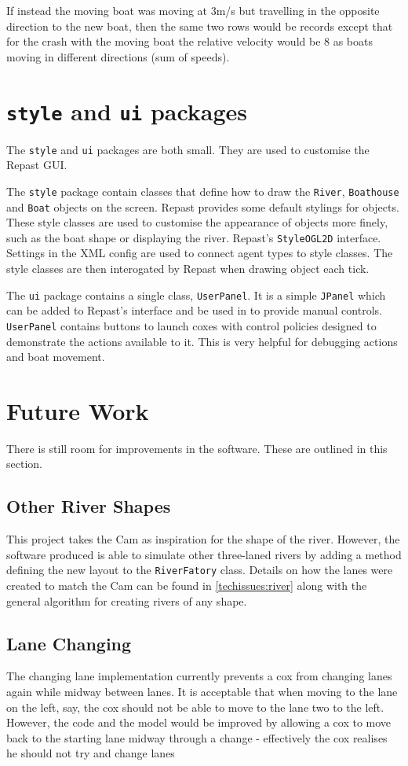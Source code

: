 If instead the moving boat was moving at 3m/s but travelling in the opposite direction to the new boat, then the same two rows would be records except that for the crash with the moving boat the relative velocity would be 8 as boats moving in different directions (sum of speeds).

\section{\texttt{style} and \texttt{ui} packages}
The \texttt{style} and \texttt{ui} packages are both small. They are used to customise the Repast
GUI. 

The \texttt{style} package contain classes
that define how to draw the \texttt{River}, \texttt{Boathouse} and \texttt{Boat} objects on the
screen. Repast provides some default stylings for objects. These style
classes are used to customise the appearance of objects more finely,
such as the boat shape or displaying the river.
Repast's \texttt{StyleOGL2D} interface. Settings in the XML config are used to
connect agent types to style classes. The style classes are then
interogated by Repast when drawing object each tick.

The \texttt{ui} package contains a single class, \texttt{UserPanel}. It is a simple \texttt{JPanel} which
can be added to Repast's interface and be used in to provide manual
controls. \texttt{UserPanel} contains buttons to launch coxes with control
policies designed to demonstrate the actions available to it. This is
very helpful for debugging actions and boat movement.

\section{Future Work}
There is still room for improvements in the software. These are outlined in this section.

\subsection{Other River Shapes}
This project takes the Cam as inspiration for the shape of the river. However, the software produced is able to simulate other three-laned rivers by adding a method defining the new layout to the \texttt{RiverFatory} class. Details on how the lanes were created to match the Cam can be found in \ref{techissues:river} along with the general algorithm for creating rivers of any shape.

\subsection{Lane Changing}
The changing lane implementation currently prevents a cox from changing lanes again while midway between lanes. It is acceptable that when moving to the lane on the left, say, the cox should not be able to move to the lane two to the left. However, the code and the model would be improved by allowing a cox to move back to the starting lane midway through a change - effectively the cox realises he should not try and change lanes

